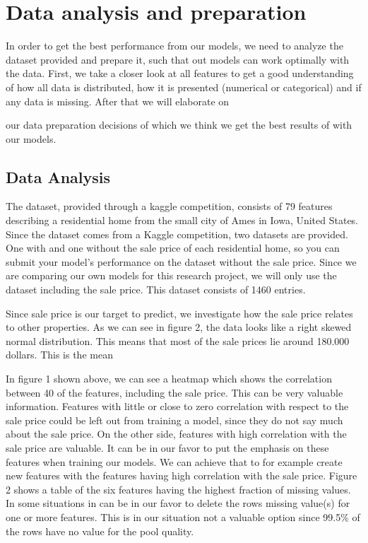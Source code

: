 \documentclass[a4paper,11pt]{article}
\begin{document}
\section{Data analysis and preparation}

In order to get the best performance from our models, we need to analyze the dataset provided and prepare it, such that out models can work optimally with the data. First, we take a closer look at all features to get a good understanding of how all data is distributed, how it is presented (numerical or categorical) and if any data is missing. After that we will elaborate on 
            
our data preparation decisions of which we think we get the best results of with our models.


\subsection{Data Analysis}
The dataset, provided through a kaggle competition, consists of 79 features describing a residential home from the small city of Ames in Iowa, United States. Since the dataset comes from a Kaggle competition, two datasets are provided. One with and one without the sale price of each residential home, so you can submit your model’s performance on the dataset without the sale price. Since we are comparing our own models for this research project, we will only use the dataset including the sale price. This dataset consists of 1460 entries. 

Since sale price is our target to predict, we investigate how the sale  price relates to other properties. As we can see in figure 2, the data looks like a right skewed normal distribution. This means that most of the sale prices lie around 180.000 dollars. This is the mean 

    In figure 1 shown above, we can see a heatmap which shows the correlation between 40 of the features, including the sale price. This can be very valuable information. Features with little or close to zero correlation with respect to the sale price could be left out from training a model, since they do not say much about the sale price. On the other side, features with high correlation with the sale price are valuable. It can be in our favor to put the emphasis on these features when training our models. We can achieve that to for example create new features with the features having high correlation with the sale price.
    Figure 2 shows a table of the six features having the highest fraction of missing values. In some situations in can be in our favor to delete the rows missing value(s) for one or more features. This is in our situation not a valuable option since 99.5\% of the rows have no value for the pool quality. 
\end{document}
